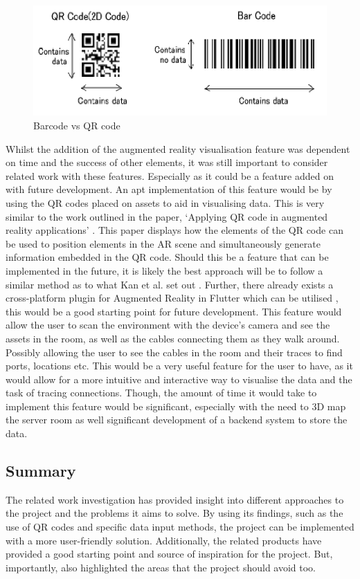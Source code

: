 \documentclass [11pt,a4paper]{article}
\begin{document}
\begin{figure}[H]
\centering
\includegraphics[width=.50\textwidth]{images/barcode_mishra.png}
\caption{Barcode vs QR code}
\label{fig:barcode}
\end{figure}


Whilst the addition of the augmented reality visualisation feature was dependent on time and the success of other elements, it was still important to consider related work with these features. Especially as it could be a feature added on with future development. An apt implementation of this feature would be by using the QR codes placed on assets to aid in visualising data. This is very similar to the work outlined in the paper, `Applying QR code in augmented reality applications' \cite{applyingQR}. This paper displays how the elements of the QR code can be used to position elements in the AR scene and simultaneously generate information embedded in the QR code. Should this be a feature that can be implemented in the future, it is likely the best approach will be to follow a similar method as to what Kan et al. set out \cite{applyingQR}. Further, there already exists a cross-platform plugin for Augmented Reality in Flutter which can be utilised \cite{ar_flutter}, this would be a good starting point for future development. This feature would allow the user to scan the environment with the device's camera and see the assets in the room, as well as the cables connecting them as they walk around. Possibly allowing the user to see the cables in the room and their traces to find ports, locations etc. This would be a very useful feature for the user to have, as it would allow for a more intuitive and interactive way to visualise the data and the task of tracing connections. Though, the amount of time it would take to implement this feature would be significant, especially with the need to 3D map the server room as well significant development of a backend system to store the data.

\subsection{Summary}
\label{sec:related_summary}

The related work investigation has provided insight into different approaches to the project and the problems it aims to solve. By using its findings, such as the use of QR codes and specific data input methods, the project can be implemented with a more user-friendly solution. Additionally, the related products have provided a good starting point and source of inspiration for the project. But, importantly, also highlighted the areas that the project should avoid too.
\end{document}
